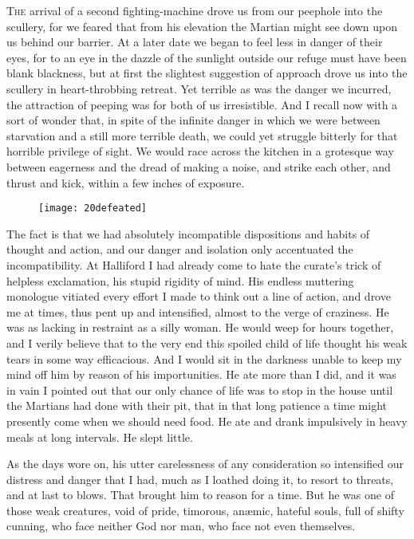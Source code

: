

\lettrine[lines=4,findent=2pt]{T}{he} arrival of a second fighting-machine drove us from our peephole into the scullery, for we feared that from his elevation the Martian might see down upon us behind our barrier. At a later date we began to feel less in danger of their eyes, for to an eye in the dazzle of the sunlight outside our refuge must have been blank blackness, but at first the slightest suggestion of approach drove us into the scullery in heart-throbbing retreat. Yet terrible as was the danger we incurred, the attraction of peeping was for both of us irresistible. And I recall now with a sort of wonder that, in spite of the infinite danger in which we were between starvation and a still more terrible death, we could yet struggle bitterly for that horrible privilege of sight. We would race across the kitchen in a grotesque way between eagerness and the dread of making a noise, and strike each other, and thrust and kick, within a few inches of exposure.

\begin{figure}[tb]
\centering
\texttt{[image: 20defeated]}
\end{figure}

The fact is that we had absolutely incompatible dispositions and habits of thought and action, and our danger and isolation only accentuated the incompatibility. At Halliford I had already come to hate the curate's trick of helpless exclamation, his stupid rigidity of mind. His endless muttering monologue vitiated every effort I made to think out a line of action, and drove me at times, thus pent up and intensified, almost to the verge of craziness. He was as lacking in restraint as a silly woman. He would weep for hours together, and I verily believe that to the very end this spoiled child of life thought his weak tears in some way efficacious. And I would sit in the darkness unable to keep my mind off him by reason of his importunities. He ate more than I did, and it was in vain I pointed out that our only chance of life was to stop in the house until the Martians had done with their pit, that in that long patience a time might presently come when we should need food. He ate and drank impulsively in heavy meals at long intervals. He slept little.

As the days wore on, his utter carelessness of any consideration so intensified our distress and danger that I had, much as I loathed doing it, to resort to threats, and at last to blows. That brought him to reason for a time. But he was one of those weak creatures, void of pride, timorous, anæmic, hateful souls, full of shifty cunning, who face neither God nor man, who face not even themselves.

